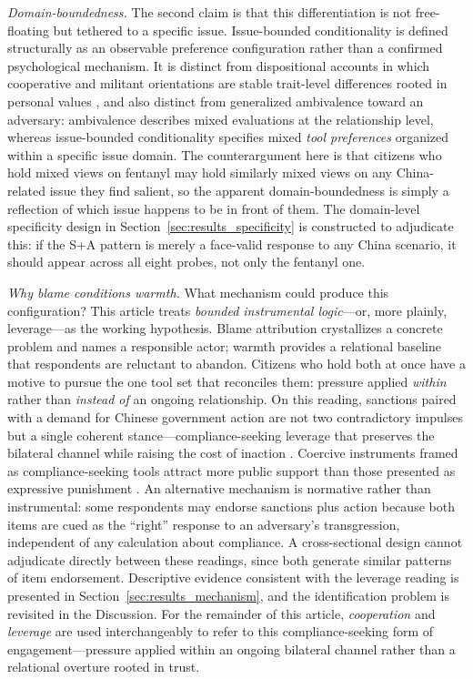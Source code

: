 \documentclass[12pt,letterpaper]{article}
\begin{document}
\textit{Domain-boundedness.} The second claim is that this differentiation is not free-floating but tethered to a specific issue. Issue-bounded conditionality is defined structurally as an observable preference configuration rather than a confirmed psychological mechanism. It is distinct from dispositional accounts in which cooperative and militant orientations are stable trait-level differences rooted in personal values \citep{rathbun_taking_2016}, and also distinct from generalized ambivalence toward an adversary: ambivalence describes mixed evaluations at the relationship level, whereas issue-bounded conditionality specifies mixed \emph{tool preferences} organized within a specific issue domain. The counterargument here is that citizens who hold mixed views on fentanyl may hold similarly mixed views on any China-related issue they find salient, so the apparent domain-boundedness is simply a reflection of which issue happens to be in front of them. The domain-level specificity design in Section~\ref{sec:results_specificity} is constructed to adjudicate this: if the S+A pattern is merely a face-valid response to any China scenario, it should appear across all eight probes, not only the fentanyl one.

\textit{Why blame conditions warmth.} What mechanism could produce this configuration? This article treats \emph{bounded instrumental logic}---or, more plainly, leverage---as the working hypothesis. Blame attribution crystallizes a concrete problem and names a responsible actor; warmth provides a relational baseline that respondents are reluctant to abandon. Citizens who hold both at once have a motive to pursue the one tool set that reconciles them: pressure applied \emph{within} rather than \emph{instead of} an ongoing relationship. On this reading, sanctions paired with a demand for Chinese government action are not two contradictory impulses but a single coherent stance---compliance-seeking leverage that preserves the bilateral channel while raising the cost of inaction \citep{tomz_domestic_2007, heinrich_sanction_2017, mclean_public_2017}. Coercive instruments framed as compliance-seeking tools attract more public support than those presented as expressive punishment \citep{frye_economic_2019}. An alternative mechanism is normative rather than instrumental: some respondents may endorse sanctions plus action because both items are cued as the ``right'' response to an adversary's transgression, independent of any calculation about compliance. A cross-sectional design cannot adjudicate directly between these readings, since both generate similar patterns of item endorsement. Descriptive evidence consistent with the leverage reading is presented in Section~\ref{sec:results_mechanism}, and the identification problem is revisited in the Discussion. For the remainder of this article, \emph{cooperation} and \emph{leverage} are used interchangeably to refer to this compliance-seeking form of engagement---pressure applied within an ongoing bilateral channel rather than a relational overture rooted in trust.
\end{document}
